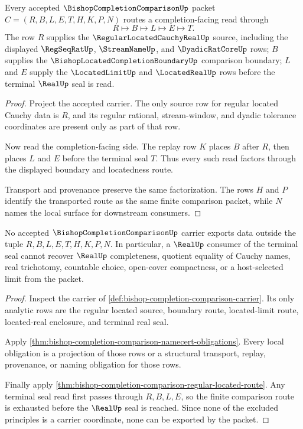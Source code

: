 \begin{theorem}
\label{thm:bishop-completion-comparison-regular-located-route}
Every accepted $\BishopCompletionComparisonUp$ packet $C=(R,B,L,E,T,H,K,P,N)$ routes a completion-facing read through
$$
R\longmapsto B\longmapsto L\longmapsto E\longmapsto T .
$$
The row $R$ supplies the $\RegularLocatedCauchyRealUp$ source, including the displayed $\RegSeqRatUp$, $\StreamNameUp$, and $\DyadicRatCoreUp$ rows; $B$ supplies the $\BishopLocatedCompletionBoundaryUp$ comparison boundary; $L$ and $E$ supply the $\LocatedLimitUp$ and $\LocatedRealUp$ rows before the terminal $\RealUp$ seal is read.
\end{theorem}
\begin{proof}
Project the accepted carrier. The only source row for regular located Cauchy data is $R$, and its regular rational, stream-window, and dyadic tolerance coordinates are present only as part of that row.

Now read the completion-facing side. The replay row $K$ places $B$ after $R$, then places $L$ and $E$ before the terminal seal $T$. Thus every such read factors through the displayed boundary and locatedness route.

Transport and provenance preserve the same factorization. The rows $H$ and $P$ identify the transported route as the same finite comparison packet, while $N$ names the local surface for downstream consumers.
\end{proof}

\begin{theorem}
\label{thm:bishop-completion-comparison-seal-nonescape}
No accepted $\BishopCompletionComparisonUp$ carrier exports data outside the tuple $R,B,L,E,T,H,K,P,N$. In particular, a $\RealUp$ consumer of the terminal seal cannot recover $\RealUp$ completeness, quotient equality of Cauchy names, real trichotomy, countable choice, open-cover compactness, or a host-selected limit from the packet.
\end{theorem}
\begin{proof}
Inspect the carrier of \autoref{def:bishop-completion-comparison-carrier}. Its only analytic rows are the regular located source, boundary route, located-limit route, located-real enclosure, and terminal real seal.

Apply \autoref{thm:bishop-completion-comparison-namecert-obligations}. Every local obligation is a projection of those rows or a structural transport, replay, provenance, or naming obligation for those rows.

Finally apply \autoref{thm:bishop-completion-comparison-regular-located-route}. Any terminal seal read first passes through $R,B,L,E$, so the finite comparison route is exhausted before the $\RealUp$ seal is reached. Since none of the excluded principles is a carrier coordinate, none can be exported by the packet.
\end{proof}

